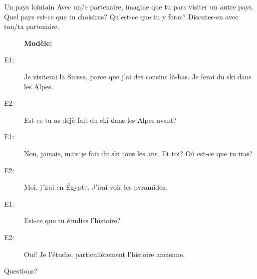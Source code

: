 \documentclass{beamer}
\begin{document}
  \begin{frame}{Un pays lointain}
    Avec un/e partenaire, imagine que tu pars visiter un autre pays.
    Quel pays est-ce que tu choisiras?
    Qu'est-ce que tu y feras?
    Discutes-en avec ton/ta partenaire.
    \begin{description}
      \item[] \textbf{Modèle:}
      \item[E1:] Je visiterai la Suisse, \alert{parce que} j'ai des cousins là-bas. Je ferai du ski dans les Alpes.
      \item[E2:] Est-ce tu as déjà fait du ski dans les Alpes avant?
      \item[E1:] Non, jamais, mais je fait du ski tous les ans. Et toi? Où est-ce que tu iras?
      \item[E2:] Moi, j'irai en Égypte. J'irai voir les pyramides.
      \item[E1:] Est-ce que tu étudies l'histoire?
      \item[E2:] Oui! Je l'étudie, particulièrement l'histoire ancienne.
    \end{description}
  \end{frame}

  \begin{frame}{}
    \begin{center}
      \Large Questions?
    \end{center}
  \end{frame}
\end{document}
